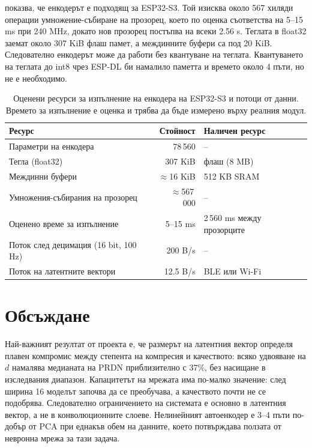 \documentclass[12pt,a4paper]{article}
\begin{document}
 показва, че енкодерът е подходящ за ESP32-S3. Той изисква около 567 хиляди операции умножение-събиране на прозорец, което по оценка съответства на 5--15 ms при 240 MHz, докато нов прозорец постъпва на всеки 2.56 s. Теглата в float32 заемат около 307 KiB флаш памет, а междинните буфери са под 20 KiB. Следователно енкодерът може да работи без квантуване на теглата. Квантуването на теглата до int8 чрез ESP-DL \cite{espdl} би намалило паметта и времето около 4 пъти, но не е необходимо.

\begin{table}[htbp]
    \centering
    \begin{tabular}{l r l}
        \toprule
        Ресурс & Стойност & Наличен ресурс \\
        \midrule
        Параметри на енкодера & 78\,560 & -- \\
        Тегла (float32) & 307 KiB & флаш (8 MB) \\
        Междинни буфери & \(\approx\)16 KiB & 512 KB SRAM \\
        Умножения-събирания на прозорец & \(\approx\)567\,000 & -- \\
        Оценено време за изпълнение & 5--15 ms & 2\,560 ms между прозорците \\
        Поток след децимация (16 bit, 100 Hz) & 200 B/s & -- \\
        Поток на латентните вектори & 12.5 B/s & BLE или Wi-Fi \\
        \bottomrule
    \end{tabular}
    \caption{Оценени ресурси за изпълнение на енкодера на ESP32-S3 и потоци от данни. Времето за изпълнение е оценка и трябва да бъде измерено върху реалния модул.}
    \label{tab:budget}
\end{table}

\section{Обсъждане}
Най-важният резултат от проекта е, че размерът на латентния вектор определя плавен компромис между степента на компресия и качеството: всяко удвояване на \(d\) намалява медианата на PRDN приблизително с 37\%, без насищане в изследвания диапазон. Капацитетът на мрежата има по-малко значение: след ширина 16 моделът започва да се преобучава, а качеството почти не се подобрява. Следователно ограничението на системата е основно в латентния вектор, а не в конволюционните слоеве. Нелинейният автоенкодер е 3--4 пъти по-добър от PCA при еднакъв обем на данните, което потвърждава ползата от невронна мрежа за тази задача.
\end{document}
